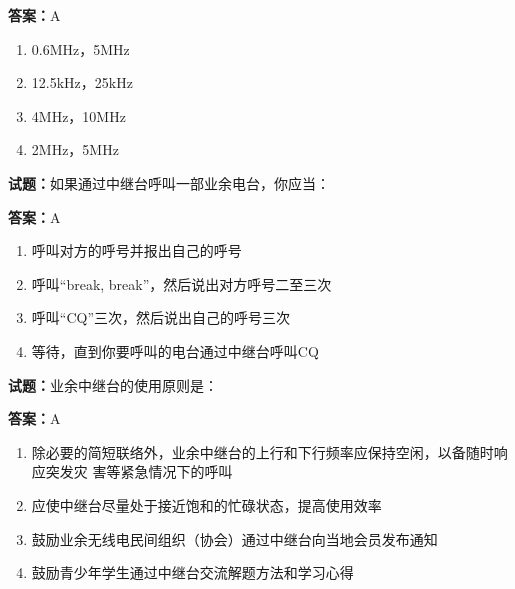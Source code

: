 \documentclass{ctexbook}
\begin{document}
\textbf{答案：}A 

\begin{enumerate}[leftmargin=3em]
  \item 0.6MHz，5MHz 

  \item 12.5kHz，25kHz 

  \item 4MHz，10MHz 

  \item 2MHz，5MHz 

\end{enumerate}






\vspace{1em}

\textbf{试题：}如果通过中继台呼叫一部业余电台，你应当： 

\textbf{答案：}A 

\begin{enumerate}[leftmargin=3em]
  \item 呼叫对方的呼号并报出自己的呼号 

  \item 呼叫“break, break”，然后说出对方呼号二至三次 

  \item 呼叫“CQ”三次，然后说出自己的呼号三次 

  \item 等待，直到你要呼叫的电台通过中继台呼叫CQ 

\end{enumerate}





\vspace{1em}

\textbf{试题：}业余中继台的使用原则是： 

\textbf{答案：}A 

\begin{enumerate}[leftmargin=3em]
  \item 除必要的简短联络外，业余中继台的上行和下行频率应保持空闲，以备随时响应突发灾
害等紧急情况下的呼叫 

  \item 应使中继台尽量处于接近饱和的忙碌状态，提高使用效率 

  \item 鼓励业余无线电民间组织（协会）通过中继台向当地会员发布通知 

  \item 鼓励青少年学生通过中继台交流解题方法和学习心得 

\end{enumerate}
\end{document}
